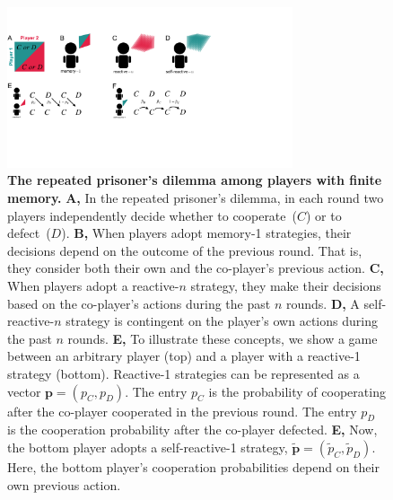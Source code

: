 \documentclass[11pt]{article}
\begin{document}
\begin{figure}[t]
  \centering
  \includegraphics[width=0.75\textwidth]{figures/conceptual_figure_model.pdf}
  \caption{\textbf{The repeated prisoner's dilemma among players with finite memory.}
  \textbf{A,} In the repeated prisoner's dilemma, in each round two players independently decide whether to cooperate~($C$) or to defect~($D$). 
   \textbf{B,} When players adopt memory-1 strategies, their decisions depend on the outcome of the previous round. That is, they consider both their own and the co-player's previous action. 
   \textbf{C,} When players adopt a reactive-$n$ strategy, they make their decisions based on the co-player's actions during the past $n$ rounds. 
   \textbf{D,} A self-reactive-$n$ strategy is contingent on the player's own actions during the past $n$ rounds. 
   \textbf{E,} To illustrate these concepts, we show a game between an arbitrary player (top) and a player with a reactive-1 strategy (bottom). 
   Reactive-1 strategies can be represented as a vector  $\mathbf{p} \!=\! (p_C, p_D)$. 
   The entry $p_C$ is the probability of cooperating after the co-player cooperated in the previous round.
   The entry $p_D$ is the cooperation probability after the co-player defected. 
   \textbf{E,} Now, the bottom player adopts a self-reactive-1 strategy, $\mathbf{\tilde p}\!=\!(\tilde p_C, \tilde p_D)$. 
   Here, the bottom player's cooperation probabilities depend on their own previous action. }\label{fig:conceptual_figure_model}
\end{figure}
\end{document}
